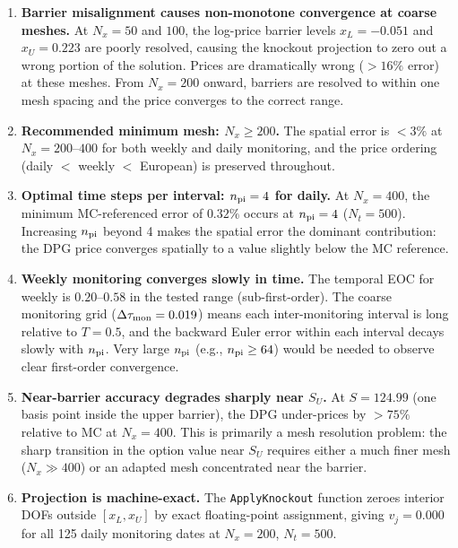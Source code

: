\documentclass[11pt,a4paper]{article}
\newcommand{\Nx}{N_x}
\newcommand{\Nt}{N_t}
\newcommand{\npi}{n_{\rm pi}}
\newcommand{\SU}{S_U}
\begin{document}
\begin{enumerate}
  \item \textbf{Barrier misalignment causes non-monotone convergence at
        coarse meshes.}  At $\Nx = 50$ and $100$, the log-price barrier
        levels $x_L = -0.051$ and $x_U = 0.223$ are poorly resolved,
        causing the knockout projection to zero out a wrong portion of
        the solution.  Prices are dramatically wrong ($>16\%$ error) at
        these meshes.  From $\Nx = 200$ onward, barriers are resolved
        to within one mesh spacing and the price converges to the
        correct range.

  \item \textbf{Recommended minimum mesh: $\Nx \ge 200$.}
        The spatial error is $< 3\%$ at $\Nx = 200$--$400$ for both
        weekly and daily monitoring, and the price ordering
        (daily $<$ weekly $<$ European) is preserved throughout.

  \item \textbf{Optimal time steps per interval: $\npi = 4$ for daily.}
        At $\Nx = 400$, the minimum MC-referenced error of $0.32\%$
        occurs at $\npi = 4$ ($\Nt = 500$).  Increasing $\npi$ beyond 4
        makes the spatial error the dominant contribution: the DPG price
        converges spatially to a value slightly below the MC reference.

  \item \textbf{Weekly monitoring converges slowly in time.}
        The temporal EOC for weekly is $0.20$--$0.58$ in the tested
        range (sub-first-order).  The coarse monitoring grid
        ($\Delta\tau_{\rm mon} = 0.019$) means each inter-monitoring
        interval is long relative to $T = 0.5$, and the backward Euler
        error within each interval decays slowly with $\npi$.
        Very large $\npi$ (e.g., $\npi \ge 64$) would be needed to
        observe clear first-order convergence.

  \item \textbf{Near-barrier accuracy degrades sharply near $\SU$.}
        At $S = 124.99$ (one basis point inside the upper barrier), the
        DPG under-prices by $> 75\%$ relative to MC at $\Nx = 400$.
        This is primarily a mesh resolution problem: the sharp transition
        in the option value near $\SU$ requires either a much finer
        mesh ($\Nx \gg 400$) or an adapted mesh concentrated near
        the barrier.

  \item \textbf{Projection is machine-exact.}
        The \texttt{ApplyKnockout} function zeroes interior DOFs outside
        $[x_L, x_U]$ by exact floating-point assignment, giving
        $v_j = 0.000$ for all 125 daily monitoring dates at
        $\Nx = 200$, $\Nt = 500$.
\end{enumerate}
\end{document}
